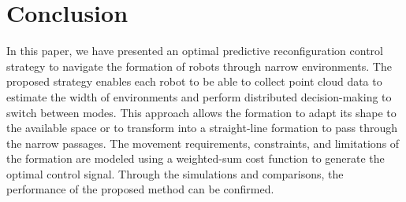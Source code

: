 \section{Conclusion}\label{sec:conclusion}

In this paper, we have presented an optimal predictive reconfiguration control strategy to navigate the formation of robots through narrow environments. The proposed strategy enables each robot to be able to collect point cloud data to estimate the width of environments and perform distributed decision-making to switch between modes. This approach allows the formation to adapt its shape to the available space or to transform into a straight-line formation to pass through the narrow passages. The movement requirements, constraints, and limitations of the formation are modeled using a weighted-sum cost function to generate the optimal control signal. Through the simulations and comparisons, the performance of the proposed method can be confirmed.